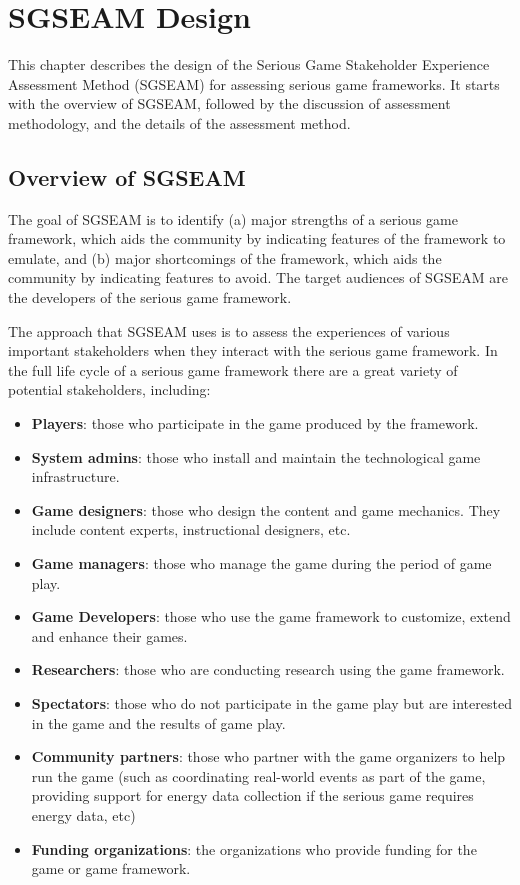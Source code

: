 \chapter{SGSEAM Design}
\label{cha:sgseam-design}

This chapter describes the design of the Serious Game Stakeholder Experience 
Assessment Method (SGSEAM) for assessing serious game frameworks. It starts with the overview of SGSEAM, followed by the discussion of assessment methodology, and the details of the assessment method.

\section{Overview of SGSEAM}

The goal of SGSEAM is to identify (a) major strengths of a serious game
framework, which aids the community by indicating features of the framework to emulate, and
(b) major shortcomings of the framework, which aids the community by indicating features to avoid.
The target audiences of SGSEAM are the developers of the serious game framework.

The approach that SGSEAM uses is to assess the experiences of various important stakeholders when
they interact with the serious game framework. In the full life cycle of a serious game framework
there are a great variety of potential stakeholders, including:

\begin{itemize}
\item \textbf{Players}: those who participate in the game produced by the framework.
\item \textbf{System admins}: those who install and maintain the technological game infrastructure.
\item \textbf{Game designers}: those who design the content and game mechanics. They include  content experts, instructional designers, etc.
\item \textbf{Game managers}: those who manage the game during the period of game play.
\item \textbf{Game Developers}: those who use the game framework to customize, extend and enhance their games.
\item \textbf{Researchers}: those who are conducting research using the game framework.
\item \textbf{Spectators}: those who do not participate in the game play but are interested in the game and the results of game play. 
\item \textbf{Community partners}: those who partner with the game organizers to help run the game (such as coordinating real-world events as part of the game, providing support for energy data
  collection if the serious game requires energy data, etc) 
\item \textbf{Funding organizations}: the organizations who provide funding for the game or game framework.
\end{itemize}

